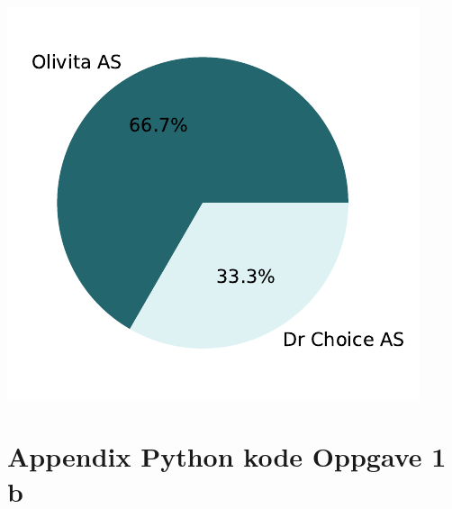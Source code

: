 \documentclass[
  12pt,
  a4paper,
  DIV=11,
  numbers=noendperiod]{scrartcl}
\begin{document}
\includegraphics{18_SOK2030_mappeoppgave_2_V24_files/figure-pdf/cell-25-output-1.pdf}

\clearpage

\section {Appendix Python kode Oppgave 1 b}
\end{document}
